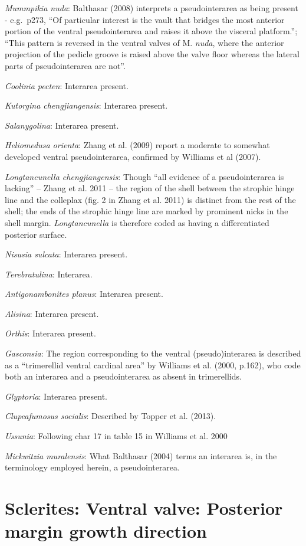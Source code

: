 \documentclass[]{book}
\theoremstyle{definition}
\theoremstyle{definition}
\theoremstyle{definition}
\theoremstyle{remark}
\begin{document}
\emph{Mummpikia nuda}: Balthasar (2008) interprets a pseudointerarea as
being present - e.g.~p273, ``Of particular interest is the vault that
bridges the most anterior portion of the ventral pseudointerarea and
raises it above the visceral platform.''; ``This pattern is reversed in
the ventral valves of M. \emph{nuda}, where the anterior projection of
the pedicle groove is raised above the valve floor whereas the lateral
parts of pseudointerarea are not''.

\emph{Coolinia pecten}: Interarea present.

\emph{Kutorgina chengjiangensis}: Interarea present.

\emph{Salanygolina}: Interarea present.

\emph{Heliomedusa orienta}: Zhang et al. (2009) report a moderate to
somewhat developed ventral pseudointerarea, confirmed by Williams et al
(2007).

\emph{Longtancunella chengjiangensis}: Though ``all evidence of a
pseudointerarea is lacking'' -- Zhang et al. 2011 -- the region of the
shell between the strophic hinge line and the colleplax (fig. 2 in Zhang
et al. 2011) is distinct from the rest of the shell; the ends of the
strophic hinge line are marked by prominent nicks in the shell margin.
\emph{Longtancunella} is therefore coded as having a differentiated
posterior surface.

\emph{Nisusia sulcata}: Interarea present.

\emph{Terebratulina}: Interarea.

\emph{Antigonambonites planus}: Interarea present.

\emph{Alisina}: Interarea present.

\emph{Orthis}: Interarea present.

\emph{Gasconsia}: The region corresponding to the ventral
(pseudo)interarea is described as a ``trimerellid ventral cardinal
area'' by Williams et al. (2000, p.162), who code both an interarea and
a pseudointerarea as absent in trimerellids.

\emph{Glyptoria}: Interarea present.

\emph{Clupeafumosus socialis}: Described by Topper et al. (2013).

\emph{Ussunia}: Following char 17 in table 15 in Williams et al. 2000

\emph{Mickwitzia muralensis}: What Balthasar (2004) terms an interarea
is, in the terminology employed herein, a pseudointerarea.

\hypertarget{sclerites-ventral-valve-posterior-margin-growth-direction}{%
\section*{Sclerites: Ventral valve: Posterior margin growth
direction}\label{sclerites-ventral-valve-posterior-margin-growth-direction}}
\end{document}
